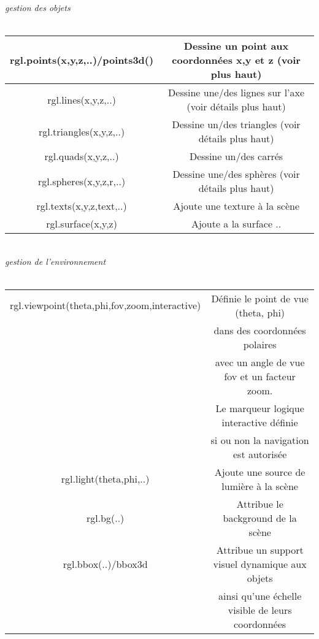 \textit{gestion des objets}\\\\
\begin{tabular}{|c|c|} 
\hline
rgl.points(x,y,z,..)/points3d() & Dessine un point aux coordonnées x,y et z (voir plus haut) \\ \hline
rgl.lines(x,y,z,..) & Dessine une/des lignes sur l'axe (voir détails plus haut) \\ \hline
rgl.triangles(x,y,z,..) & Dessine un/des triangles (voir détails plus haut) \\ \hline
rgl.quads(x,y,z,..) & Dessine un/des carrés \\ \hline
rgl.spheres(x,y,z,r,..) & Dessine une/des sphères (voir détails plus haut) \\ \hline
rgl.texts(x,y,z,text,..) & Ajoute une texture à la scène \\ \hline
rgl.surface(x,y,z) & Ajoute a la surface .. \\ \hline

\end{tabular}\\
\newpage
\textit{gestion de l'environnement}\\\\
\begin{tabular}{|c|c|}
\hline
rgl.viewpoint(theta,phi,fov,zoom,interactive) & Définie le point de vue (theta, phi)\\ &  dans des coordonnées polaires  \\ & avec un angle de vue fov et un facteur zoom.\\ & Le marqueur logique interactive définie \\ & si ou non la navigation est autorisée \\ \hline
rgl.light(theta,phi,..) & Ajoute une source de lumière à la scène \\ \hline
rgl.bg(..) & Attribue le background de la scène \\ \hline
rgl.bbox(..)/bbox3d & Attribue un support visuel dynamique aux objets\\ & ainsi qu'une échelle visible de leurs coordonnées \\ \hline

\end{tabular}\\
